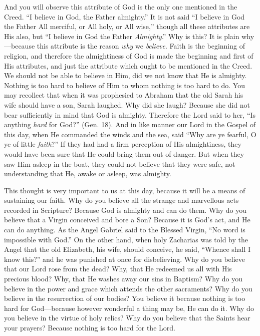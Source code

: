 And you will observe this attribute of God is the
only one mentioned in the Creed. ``I believe in God, the Father
almighty.'' It is not said ``I believe in God the Father All
merciful, or All holy, or All wise,'' though all these attributes are
His also, but ``I believe in God the Father \emph{Almighty}.'' Why
is this? It is plain why—because this attribute is the reason \emph{why}
we \emph{believe}. Faith is the beginning of religion, and therefore
the almightiness of God is made the beginning and first of His
attributes, and just the attribute which ought to be mentioned in the
Creed. We should not be able to believe in Him, did we not know that
He is almighty. Nothing is too hard to believe of Him to whom nothing
is too hard to do. You may recollect that when it was prophesied to
Abraham that the old Sarah his wife should have a son, Sarah laughed.
Why did she laugh? Because she did not bear sufficiently in mind that
God is almighty. Therefore the Lord said to her, ``Is anything \emph{hard}
for God?'' (Gen. 18). And in like manner our Lord in the Gospel of this
day, when He commanded the winds and the sea, said ``Why are ye
fearful, O ye of little \emph{faith}?'' If they had had a firm
perception of His almightiness, they would have been sure that He
could bring them out of danger. But when they saw Him asleep in the
boat, they could not believe that they were safe, not understanding
that He, awake or asleep, was almighty.

This thought is very important to us at this day,
because it will be a means of sustaining our faith. Why do you
believe all the strange and marvellous acts recorded in Scripture?
Because God is almighty and can do them. Why do you believe that a
Virgin conceived and bore a Son? Because it is God's act, and He can
do anything. As the Angel Gabriel said to the Blessed Virgin, ``No
word is impossible with God.'' On the other hand, when holy Zacharias
was told by the Angel that the old Elizabeth, his wife, should
conceive, he said, ``Whence shall I know this?'' and he was
punished at once for disbelieving. Why do you believe that our Lord
rose from the dead? Why, that He redeemed us all with His precious
blood? Why, that He washes away our sins in Baptism? Why do you
believe in the power and grace which attends the other sacraments? Why
do you believe in the resurrection of our bodies? You believe it
because nothing is too hard for God—because however wonderful a
thing may be, He can do it. Why do you believe in the virtue of holy
relics? Why do you believe that the Saints hear your prayers? Because
nothing is too hard for the Lord.

